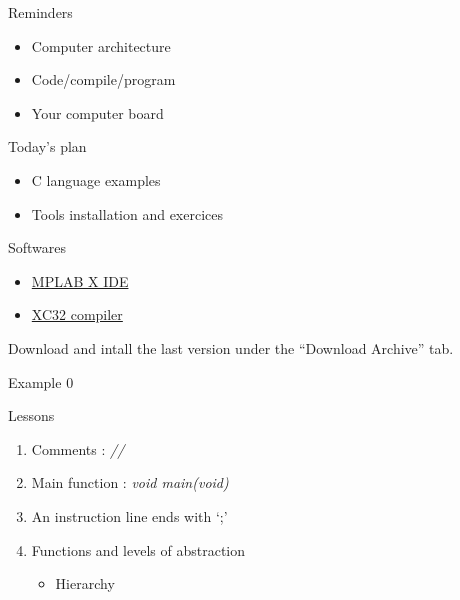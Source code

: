 \begin{frame}{Reminders}

\begin{itemize}
\tightlist
\item
  Computer architecture
\item
  Code/compile/program
\item
  Your computer board
\end{itemize}

\end{frame}

\begin{frame}{Today's plan}

\begin{itemize}
\tightlist
\item
  C language examples
\item
  Tools installation and exercices
\end{itemize}

\end{frame}

\begin{frame}{Softwares}

\begin{itemize}
\tightlist
\item
  \href{http://www.microchip.com/mplab/mplab-x-ide?tab=t2}{MPLAB X IDE}
\item
  \href{http://www.microchip.com/mplab/compilers}{XC32 compiler}
\end{itemize}

Download and intall the last version under the ``Download Archive'' tab.

\end{frame}

\begin{frame}{Example 0}







\end{frame}

\begin{frame}{Lessons}

\begin{enumerate}
\def\labelenumi{\arabic{enumi}.}
\tightlist
\item
  Comments : \emph{//}
\item
  Main function : \emph{void main(void)}
\item
  An instruction line ends with `;'
\item
  Functions and levels of abstraction

  \begin{itemize}
  \tightlist
  \item
    Hierarchy
  \end{itemize}
\end{enumerate}

\end{frame}


